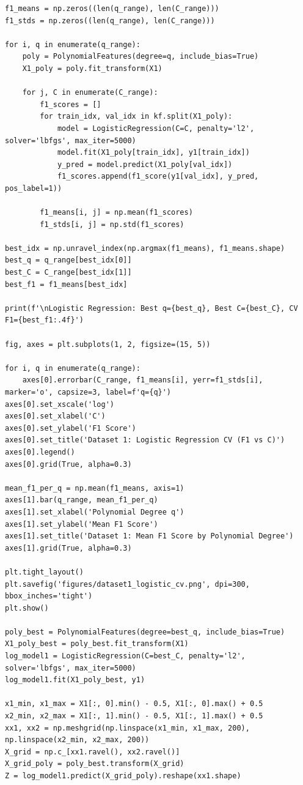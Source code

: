 \documentclass[11pt,a4paper]{article}
\begin{document}
\begin{lstlisting}
f1_means = np.zeros((len(q_range), len(C_range)))
f1_stds = np.zeros((len(q_range), len(C_range)))

for i, q in enumerate(q_range):
    poly = PolynomialFeatures(degree=q, include_bias=True)
    X1_poly = poly.fit_transform(X1)
    
    for j, C in enumerate(C_range):
        f1_scores = []
        for train_idx, val_idx in kf.split(X1_poly):
            model = LogisticRegression(C=C, penalty='l2', solver='lbfgs', max_iter=5000)
            model.fit(X1_poly[train_idx], y1[train_idx])
            y_pred = model.predict(X1_poly[val_idx])
            f1_scores.append(f1_score(y1[val_idx], y_pred, pos_label=1))
        
        f1_means[i, j] = np.mean(f1_scores)
        f1_stds[i, j] = np.std(f1_scores)

best_idx = np.unravel_index(np.argmax(f1_means), f1_means.shape)
best_q = q_range[best_idx[0]]
best_C = C_range[best_idx[1]]
best_f1 = f1_means[best_idx]

print(f'\nLogistic Regression: Best q={best_q}, Best C={best_C}, CV F1={best_f1:.4f}')

fig, axes = plt.subplots(1, 2, figsize=(15, 5))

for i, q in enumerate(q_range):
    axes[0].errorbar(C_range, f1_means[i], yerr=f1_stds[i], marker='o', capsize=3, label=f'q={q}')
axes[0].set_xscale('log')
axes[0].set_xlabel('C')
axes[0].set_ylabel('F1 Score')
axes[0].set_title('Dataset 1: Logistic Regression CV (F1 vs C)')
axes[0].legend()
axes[0].grid(True, alpha=0.3)

mean_f1_per_q = np.mean(f1_means, axis=1)
axes[1].bar(q_range, mean_f1_per_q)
axes[1].set_xlabel('Polynomial Degree q')
axes[1].set_ylabel('Mean F1 Score')
axes[1].set_title('Dataset 1: Mean F1 Score by Polynomial Degree')
axes[1].grid(True, alpha=0.3)

plt.tight_layout()
plt.savefig('figures/dataset1_logistic_cv.png', dpi=300, bbox_inches='tight')
plt.show()

poly_best = PolynomialFeatures(degree=best_q, include_bias=True)
X1_poly_best = poly_best.fit_transform(X1)
log_model1 = LogisticRegression(C=best_C, penalty='l2', solver='lbfgs', max_iter=5000)
log_model1.fit(X1_poly_best, y1)

x1_min, x1_max = X1[:, 0].min() - 0.5, X1[:, 0].max() + 0.5
x2_min, x2_max = X1[:, 1].min() - 0.5, X1[:, 1].max() + 0.5
xx1, xx2 = np.meshgrid(np.linspace(x1_min, x1_max, 200), np.linspace(x2_min, x2_max, 200))
X_grid = np.c_[xx1.ravel(), xx2.ravel()]
X_grid_poly = poly_best.transform(X_grid)
Z = log_model1.predict(X_grid_poly).reshape(xx1.shape)


\end{lstlisting}
\end{document}
